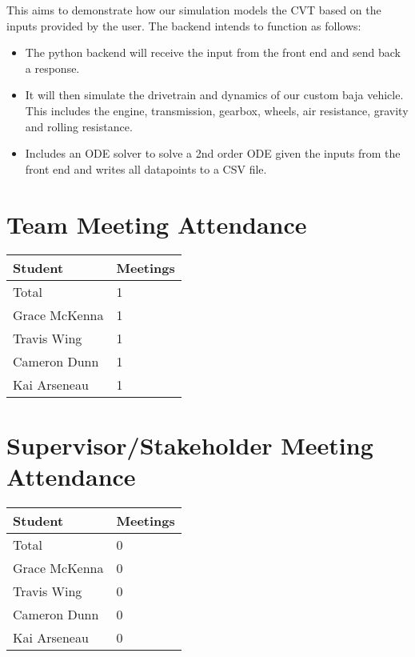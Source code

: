 \documentclass{article}
\begin{document}
This aims to demonstrate how our simulation models the CVT based on the inputs provided by the user. The backend intends to function as follows:
\begin{itemize}
  \item The python backend will receive the input from the front end and send back a response.
  \item It will then simulate the drivetrain and dynamics of our custom baja vehicle. This includes the engine, transmission, gearbox, wheels, air resistance, gravity and rolling resistance.
  \item Includes an ODE solver to solve a 2nd order ODE given the inputs from the front end and writes all datapoints to a CSV file.
\end{itemize}

\section{Team Meeting Attendance}



\begin{table}[H]
\centering
\begin{tabular}{ll}
\toprule
\textbf{Student} & \textbf{Meetings}\\
\midrule
Total & 1\\
Grace McKenna & 1\\
Travis Wing & 1\\
Cameron Dunn & 1\\
Kai Arseneau & 1\\
\bottomrule
\end{tabular}
\end{table}


\section{Supervisor/Stakeholder Meeting Attendance}

\begin{table}[H]
\centering
\begin{tabular}{ll}
\toprule
\textbf{Student} & \textbf{Meetings}\\
\midrule
Total & 0\\
Grace McKenna & 0\\
Travis Wing & 0\\
Cameron Dunn & 0\\
Kai Arseneau & 0\\
\bottomrule
\end{tabular}
\end{table}
\end{document}
